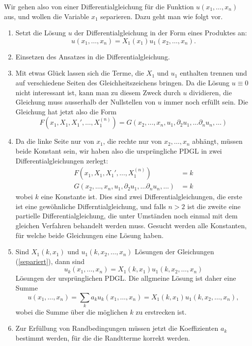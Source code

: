 Wir gehen also von einer Differentialgleichung für die Funktion
$u(x_1,\dots,x_n)$ aus, und wollen die Variable $x_1$ separieren.
Dazu geht man wie folgt vor.
\begin{enumerate}
\item Setzt die Lösung $u$ der Differentialgleichung in der
Form eines Produktes an:
\[
u(x_1,\dots,x_n)=X_1(x_1)u_1(x_2,\dots,x_n).
\]
\item Einsetzen des Ansatzes in die Differentialgleichung.
\item
Mit etwas Glück lassen sich die Terme, die
$X_1$ und $u_1$ enthalten trennen und auf verschiedene Seiten
des Gleichheitszeichens bringen.
Da die Lösung $u\equiv 0$ nicht interessant ist, kann man
zu diesem Zweck durch $u$ dividieren, die Gleichung muss
ausserhalb der Nullstellen von $u$ immer noch erfüllt sein.
Die Gleichung hat jetzt also die Form
\[
F(x_1,X_1,X_1',\dots,X_1^{(n)})
=
G(x_2,\dots,x_n,u_1,\partial_2u_1,\dots\partial_nu_n,\dots)
\]
\item
Da die linke Seite nur von $x_1$, die rechte nur von $x_2,\dots,x_n$
abhängt, müssen beide Konstant sein, wir haben also die ursprüngliche
PDGL in zwei Differentialgleichungen zerlegt:
\begin{equation}
\begin{aligned}
F(x_1, X_1,X_1',\dots, X_1^{(n)})&=k\\
G(x_2,\dots,x_n,u_1,\partial_2u_1,\dots\partial_nu_n,\dots)&=k
\end{aligned}
\label{separiert}
\end{equation}
wobei $k$ eine Konstante ist.
Dies sind zwei Differentialgleichungen, die erste ist eine
gewöhnliche Differntialgleichung, und falls $n>2$ ist die zweite
eine partielle Differentialgleichung, die unter Umständen noch
einmal mit dem gleichen Verfahren behandelt werden muss.
Gesucht werden alle Konstanten,
für welche beide Gleichungen eine Lösung haben.
\item Sind $X_1(k,x_1)$ und $u_1(k,x_2,\dots,x_n)$ Lösungen der
Gleichungen (\ref{separiert}), dann sind 
\[
u_k(x_1,\dots,x_n)=X_1(k,x_1)u_1(k,x_2,\dots,x_n)
\]
Lösungen der ursprünglichen PDGL. Die allgmeine Lösung ist daher
eine Summe
\[
u(x_1,\dots,x_n)=
\sum_{k}
a_k
u_k(x_1,\dots,x_n)=X_1(k,x_1)u_1(k,x_2,\dots,x_n),
\]
wobei die Summe über die möglichen $k$ zu erstrecken ist.
\item
Zur Erfüllung von Randbedingungen müssen jetzt die Koeffizienten
$a_k$ bestimmt werden, für die die Randtterme korrekt werden.
\end{enumerate}
